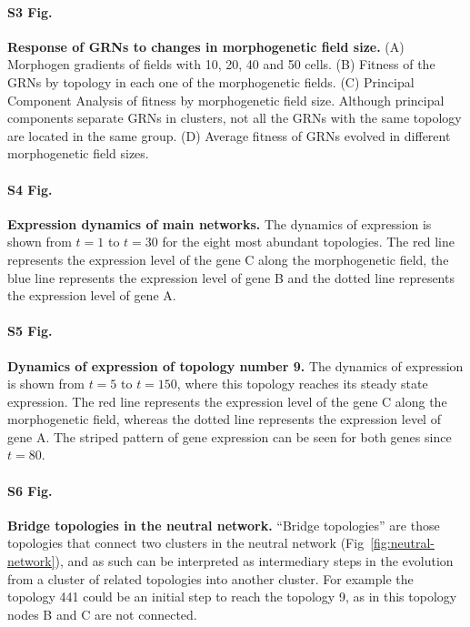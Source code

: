 \documentclass[10pt,letterpaper]{article}
\begin{document}
\paragraph*{S3 Fig.}
\label{S3_Fig}
{\bf Response of GRNs to changes in morphogenetic field size.}
(A) Morphogen gradients of fields with 10, 20, 40 and 50 cells. (B) Fitness of the
GRNs by topology in each one of the morphogenetic fields. (C) Principal Component
Analysis of fitness by morphogenetic field size. Although principal components
separate GRNs in clusters, not all the GRNs with the same topology are located in the
same group. (D) Average fitness of GRNs evolved in different morphogenetic
field sizes.

\paragraph*{S4 Fig.}
\label{S4_Fig}
{\bf Expression dynamics of main networks.}
The dynamics of expression is shown from $t = 1$ to $t = 30$ for the eight most
abundant topologies. The red line
represents the expression level of the gene C along the morphogenetic field,
the blue line represents the expression level of gene B and
the dotted line represents the expression level of gene A.

\paragraph*{S5 Fig.}
\label{S5_Fig}
{\bf Dynamics of expression of topology number 9.}
The dynamics of expression is shown from $t = 5$ to $t = 150$, where this
topology reaches its steady state expression. The red line
represents the expression level of the gene C along the morphogenetic field,
whereas the dotted line represents the expression level of gene A. The
striped pattern of gene expression can be seen for both genes since $t = 80$.

\paragraph*{S6 Fig.}
\label{S6_Fig}
{\bf Bridge topologies in the neutral network.}
``Bridge topologies'' are those topologies that connect two clusters in the neutral
network (Fig~\ref{fig:neutral-network}), and as such can be interpreted as
intermediary steps in the evolution from a cluster of related topologies into
another cluster. For example the topology 441 could be an initial step to reach the
topology 9, as in this topology nodes B and C are not connected.
\end{document}
